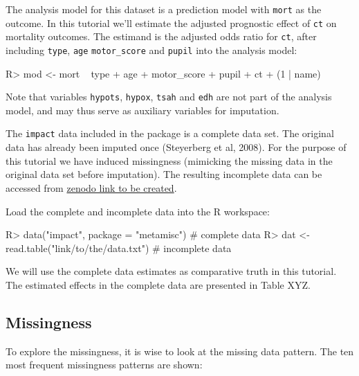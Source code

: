 \documentclass[
]{jss}
\begin{document}
The analysis model for this dataset is a prediction model with
\texttt{mort} as the outcome. In this tutorial we'll estimate the
adjusted prognostic effect of \texttt{ct} on mortality outcomes. The
estimand is the adjusted odds ratio for \texttt{ct}, after including
\texttt{type}, \texttt{age} \texttt{motor\_score} and \texttt{pupil}
into the analysis model:

\begin{CodeChunk}
\begin{CodeInput}
R> mod <- mort ~ type + age + motor_score + pupil + ct + (1 | name) 
\end{CodeInput}
\end{CodeChunk}

Note that variables \texttt{hypots}, \texttt{hypox}, \texttt{tsah} and
\texttt{edh} are not part of the analysis model, and may thus serve as
auxiliary variables for imputation.

The \texttt{impact} data included in the  package is a
complete data set. The original data has already been imputed once
(Steyerberg et al, 2008). For the purpose of this tutorial we have
induced missingness (mimicking the missing data in the original data set
before imputation). The resulting incomplete data can be accessed from
\href{https://zenodo.com}{zenodo link to be created}.

Load the complete and incomplete data into the R workspace:

\begin{CodeChunk}
\begin{CodeInput}
R> data("impact", package = "metamisc")      # complete data
R> dat <- read.table("link/to/the/data.txt") # incomplete data
\end{CodeInput}
\end{CodeChunk}

We will use the complete data estimates as comparative truth in this
tutorial. The estimated effects in the complete data are presented in
Table XYZ.

\hypertarget{missingness}{%
\subsection{Missingness}\label{missingness}}

To explore the missingness, it is wise to look at the missing data
pattern. The ten most frequent missingness patterns are shown:
\end{document}
